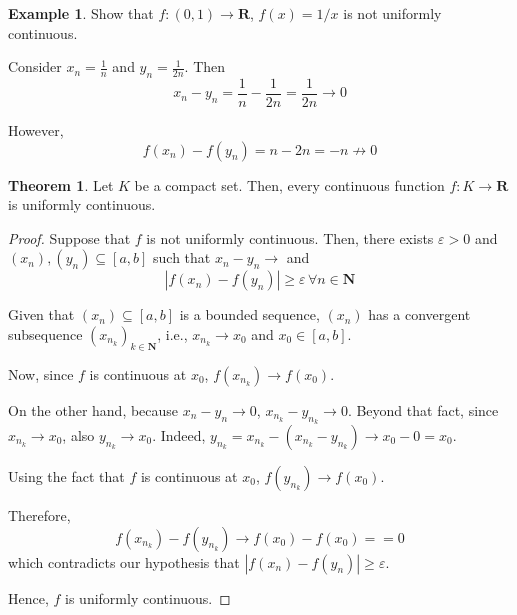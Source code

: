 \documentclass[12pt,a4paper]{article}
\theoremstyle{definition}
\newtheorem{theorem}{Theorem}[section]
\newtheorem{example}{Example}[section]
\begin{document}
\begin{example}
	Show that $f : (0,1) \longrightarrow \textbf{R}$, $f(x) = 1/x$ is not uniformly continuous.
	
	Consider $x_n = \frac{1}{n}$ and $y_n = \frac{1}{2n}$. Then
	\[
		x_n - y_n = \frac{1}{n} - \frac{1}{2n} = \frac{1}{2n} \longrightarrow 0
	\]
	
	However,
	\[
		f(x_n) - f(y_n) = n - 2n = -n \not\longrightarrow 0
	\]
\end{example}

\begin{theorem}
	Let $K$ be a compact set. Then, every continuous function $f : K \longrightarrow \textbf{R}$ is uniformly continuous.
\end{theorem}

\begin{proof}
	Suppose that $f$ is not uniformly continuous. Then, there exists $\varepsilon > 0$ and $(x_n), (y_n) \subseteq [a,b]$ such that $x_n - y_n \longrightarrow $ and
	\[
		|f(x_n) - f(y_n)| \geq \varepsilon \, \forall n \in \textbf{N}
	\]
	
	Given that $(x_n) \subseteq [a,b]$ is a bounded sequence, $(x_n)$ has a convergent subsequence $(x_{n_k})_{k \in \textbf{N}}$, i.e., $x_{n_k} \longrightarrow x_0$ and $x_0 \in [a,b]$.
	
	Now, since $f$ is continuous at $x_0$, $f(x_{n_k}) \longrightarrow f(x_0)$.
	
	On the other hand, because $x_n - y_n \longrightarrow 0$, $x_{n_k} - y_{n_k} \longrightarrow 0$. Beyond that fact, since $x_{n_k} \longrightarrow x_0$, also $y_{n_k} \longrightarrow x_0$. Indeed, $y_{n_k} = x_{n_k} - (x_{n_k} - y_{n_k}) \longrightarrow x_0 - 0 = x_0$.
	
	Using the fact that $f$ is continuous at $x_0$, $f(y_{n_k}) \longrightarrow f(x_0)$. 
	
	Therefore,
	\[
		f(x_{n_k}) - f(y_{n_k}) \longrightarrow f(x_0) - f(x_0) == 0
	\]
	which contradicts our hypothesis that $|f(x_n) - f(y_n)| \geq \varepsilon$.
	
	Hence, $f$ is uniformly continuous.
\end{proof}


\newpage
\nocite{*}


\end{document}
